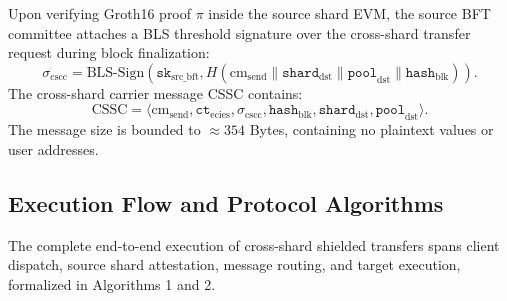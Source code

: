 \documentclass[journal,10pt,twocolumn]{IEEEtran}
\theoremstyle{definition}
\theoremstyle{remark}
\begin{document}
Upon verifying Groth16 proof $\pi$ inside the source shard EVM, the source BFT committee attaches a BLS threshold signature over the cross-shard transfer request during block finalization:
\begin{equation}
\sigma_{\text{cscc}} = \text{BLS-Sign}(\mathtt{sk}_{\text{src\_bft}}, H(\text{cm}_{\text{send}} \parallel \mathtt{shard}_{\text{dst}} \parallel \mathtt{pool}_{\text{dst}} \parallel \mathtt{hash}_{\text{blk}})).
\end{equation}
The cross-shard carrier message CSSC contains:
\begin{equation}
\text{CSSC} = \langle \text{cm}_{\text{send}}, \mathtt{ct}_{\text{ecies}}, \sigma_{\text{cscc}}, \mathtt{hash}_{\text{blk}}, \mathtt{shard}_{\text{dst}}, \mathtt{pool}_{\text{dst}} \rangle.
\end{equation}
The message size is bounded to $\approx 354$ Bytes, containing no plaintext values or user addresses.

\subsection{Execution Flow and Protocol Algorithms}
The complete end-to-end execution of cross-shard shielded transfers spans client dispatch, source shard attestation, message routing, and target execution, formalized in Algorithms 1 and 2.
\end{document}
